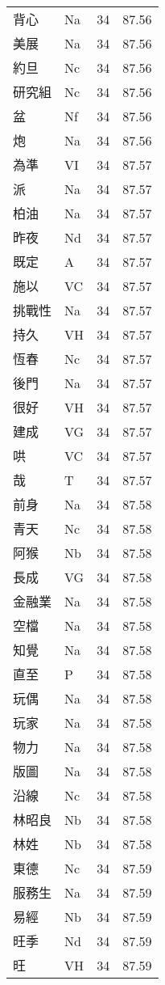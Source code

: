 \documentclass[twocolumn]{book}
\begin{document}
\begin{supertabular}{llrr}
背心 & Na & 34 &  87.56\\
美展 & Na & 34 &  87.56\\
約旦 & Nc & 34 &  87.56\\
研究組 & Nc & 34 &  87.56\\
盆 & Nf & 34 &  87.56\\
炮 & Na & 34 &  87.56\\
為準 & VI & 34 &  87.57\\
派 & Na & 34 &  87.57\\
柏油 & Na & 34 &  87.57\\
昨夜 & Nd & 34 &  87.57\\
既定 & A & 34 &  87.57\\
施以 & VC & 34 &  87.57\\
挑戰性 & Na & 34 &  87.57\\
持久 & VH & 34 &  87.57\\
恆春 & Nc & 34 &  87.57\\
後門 & Na & 34 &  87.57\\
很好 & VH & 34 &  87.57\\
建成 & VG & 34 &  87.57\\
哄 & VC & 34 &  87.57\\
哉 & T & 34 &  87.57\\
前身 & Na & 34 &  87.58\\
青天 & Nc & 34 &  87.58\\
阿猴 & Nb & 34 &  87.58\\
長成 & VG & 34 &  87.58\\
金融業 & Na & 34 &  87.58\\
空檔 & Na & 34 &  87.58\\
知覺 & Na & 34 &  87.58\\
直至 & P & 34 &  87.58\\
玩偶 & Na & 34 &  87.58\\
玩家 & Na & 34 &  87.58\\
物力 & Na & 34 &  87.58\\
版圖 & Na & 34 &  87.58\\
沿線 & Nc & 34 &  87.58\\
林昭良 & Nb & 34 &  87.58\\
林姓 & Nb & 34 &  87.58\\
東德 & Nc & 34 &  87.59\\
服務生 & Na & 34 &  87.59\\
易經 & Nb & 34 &  87.59\\
旺季 & Nd & 34 &  87.59\\
旺 & VH & 34 &  87.59\\

\end{supertabular}
\end{document}
